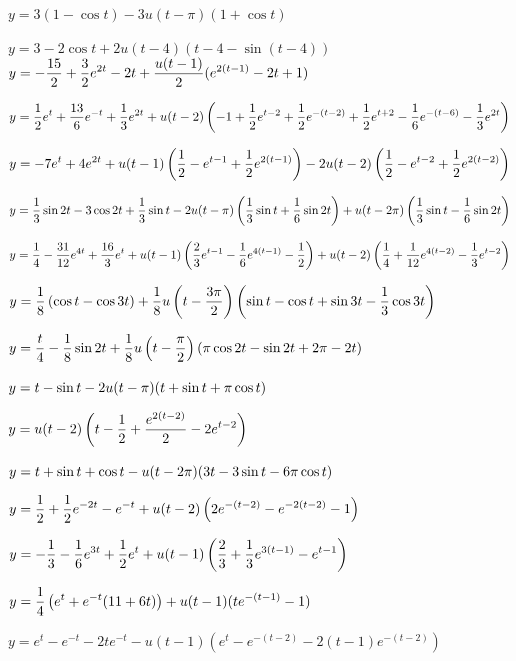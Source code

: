 \medskip

  $y=3(1-\cos t)-3u(t-\pi)(1+\cos t)$

 $y=3-2\cos t+2u(t-4)\left(t-4-\sin
(t-4)\right)$
  $y=\displaystyle{-\frac{15}{2}+\frac{3}{2}e^{2t}-2t+\frac{u(t-1)}{2}(e^{2(t-1)}-2t+1)}$

$y=\displaystyle{\frac{1}{2}e^{t}+\frac{13}{6}e^{-t}+\frac{1}{3}e^{2t}
+u(t-2)\left(-1+\frac{1}{2}e^{t-2}+\frac{1}{2}e^{-(t-2)}+
\frac{1}{2}e^{t+2}-\frac{1}{6}e^{-(t-6)}-\frac{1}{3}e^{2t}\right)}$

$y=\displaystyle{-7e^{t}+4e^{2t}+u(t-1)\left(\frac{1}{2}-e^{t-1}+\frac{1}{2}e^{2(t-1)}\right)-2u(t-2)\left(\frac{1}{2}-
e^{t-2}+\frac{1}{2}e^{2(t-2)}\right)}$

  $y=\displaystyle{\frac{1}{3}\sin2t-3\cos2t+\frac{1}{3}\sin t
-2u(t-\pi)\left(\frac{1}{3}\sin t+\frac{1}{6}\sin2t\right)
+u(t-2\pi)\left(\frac{1}{3}\sin
t-\frac{1}{6}\sin2t\right)}$

  $y=\displaystyle{\frac{1}{4}-\frac{31}{12}e^{4t}+\frac{16}{3}e^{t}
+u(t-1)\left(\frac{2}{3}e^{t-1}-\frac{1}{6}e^{4(t-1)}-\frac{1}{2}
\right)
+u(t-2)\left(\frac{1}{4}+\frac{1}{12}e^{4(t-2)}-\frac{1}{3}e^{t-2}\right)}$

$y=\displaystyle{\frac{1}{8}\left(\cos t-\cos3t\right)+
\frac{1}{8}u\left(t-\frac{3\pi}{2}\right)\left(\sin t-\cos t+\sin
3t-\frac{1}{3}\cos3t\right)}$

  $y=\displaystyle{\frac{t}{4}-\frac{1}{8}\sin2t
+\frac{1}{8}u\left(t-\frac{\pi}{2}\right)
(\pi\cos2t-\sin2t+2\pi-2t)}$

 $y=\displaystyle{t-\sin t-2u(t-\pi)(t+\sin t+\pi\cos t)}$

$y=\displaystyle{u(t-2)\left(t-\frac{1}{2}+\frac{e^{2(t-2)}}{2}
-2e^{t-2}\right)}$

$y=\displaystyle{t+\sin t+\cos t-u(t-2\pi)(3t-3\sin t-6\pi\cos t)}$

$y=\displaystyle{\frac{1}{2}+\frac{1}{2}e^{-2t}-e^{-t}+u(t-2)\left(2
e^{-(t-2)}-e^{-2(t-2)}-1\right)}$

$y=\displaystyle{-\frac{1}{3}-\frac{1}{6}e^{3t}
+\frac{1}{2}e^{t}+u(t-1)\left(\frac{2}{3}+\frac{1}{3}e^{3(t-1)}
-e^{t-1}\right)}$

$y=\displaystyle{\frac{1}{4}\left(e^{t}+e^{-t}(11+6t)\right)
+u(t-1)(te^{-(t-1)}-1)}$

$y=e^{t}-e^{-t}-2te^{-t}-u(t-1)\left(e^{t}-e^{-(t-2)}-2(t-1)e^{-(t-2)}\right)$

